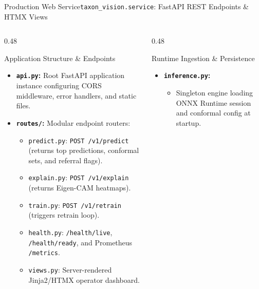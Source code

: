 \begin{frame}{Production Web Service}{\texttt{taxon\_vision.service}: FastAPI REST Endpoints \& HTMX Views}
    \begin{columns}[T]
        \begin{column}{0.48\textwidth}
            \begin{block}{Application Structure \& Endpoints}
                \begin{itemize}\scriptsize
                    \item \textbf{\texttt{api.py}:} Root FastAPI application instance configuring CORS middleware, error handlers, and static files.
                    \item \textbf{\texttt{routes/}:} Modular endpoint routers:
                        \begin{itemize}\tiny
                            \item \texttt{predict.py}: \texttt{POST /v1/predict} (returns top predictions, conformal sets, and referral flags).
                            \item \texttt{explain.py}: \texttt{POST /v1/explain} (returns Eigen-CAM heatmaps).
                            \item \texttt{train.py}: \texttt{POST /v1/retrain} (triggers retrain loop).
                            \item \texttt{health.py}: \texttt{/health/live}, \texttt{/health/ready}, and Prometheus \texttt{/metrics}.
                            \item \texttt{views.py}: Server-rendered Jinja2/HTMX operator dashboard.
                        \end{itemize}
                \end{itemize}
            \end{block}
        \end{column}
        \begin{column}{0.48\textwidth}
            \begin{block}{Runtime Ingestion \& Persistence}
                \begin{itemize}\scriptsize
                    \item \textbf{\texttt{inference.py}:}
                        \begin{itemize}\tiny
                            \item Singleton engine loading ONNX Runtime session and conformal config at startup.

\end{itemize}
\end{itemize}
\end{block}
\end{column}
\end{columns}
\end{frame}

